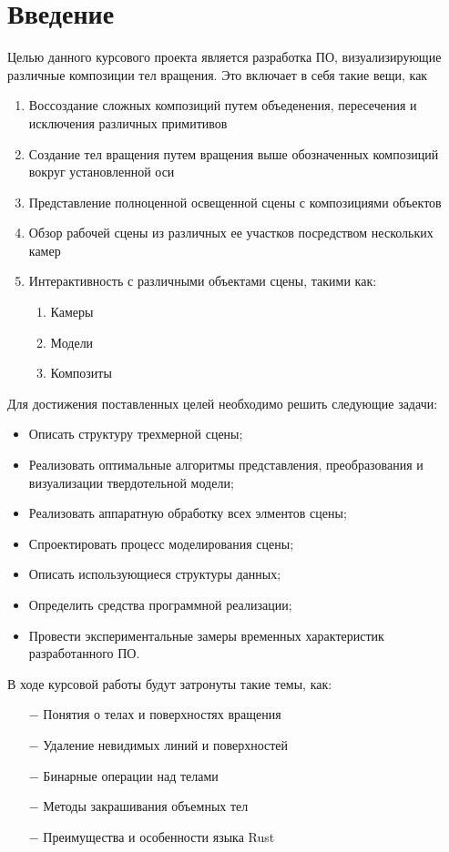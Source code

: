 \chapter*{Введение}
Целью данного курсового проекта является разработка ПО, визуализирующие различные композиции тел вращения.
Это включает в себя такие вещи, как
\begin{enumerate}
    \item Воссоздание сложных композиций путем объеденения, пересечения и исключения различных примитивов
    \item Создание тел вращения путем вращения выше обозначенных композиций вокруг установленной оси
    \item Представление полноценной освещенной сцены с композициями объектов
    \item Обзор рабочей сцены из различных ее участков посредством нескольких камер
    \item Интерактивность с различными объектами сцены, такими как:
    \begin{enumerate}
        \item Камеры
        \item Модели
        \item Композиты
    \end{enumerate}
\end{enumerate}
Для достижения поставленных целей необходимо решить следующие задачи:
\begin{itemize}
    \item Описать структуру трехмерной сцены;
    \item Реализовать оптимальные алгоритмы представления, преобразования и визуализации твердотельной модели;
    \item Реализовать аппаратную обработку всех элментов сцены;
    \item Спроектировать процесс моделирования сцены;
    \item Описать использующиеся структуры данных;
    \item Определить средства программной реализации;
    \item Провести экспериментальные замеры временных характеристик разработанного ПО.
\end{itemize}
В ходе курсовой работы будут затронуты такие темы, как:
\begin{itemize}
    \item[$-$] Понятия о телах и поверхностях вращения
    \item[$-$] Удаление невидимых линий и поверхностей
    \item[$-$] Бинарные операции над телами
    \item[$-$] Методы закрашивания объемных тел
    \item[$-$] Преимущества и особенности языка Rust
\end{itemize}
